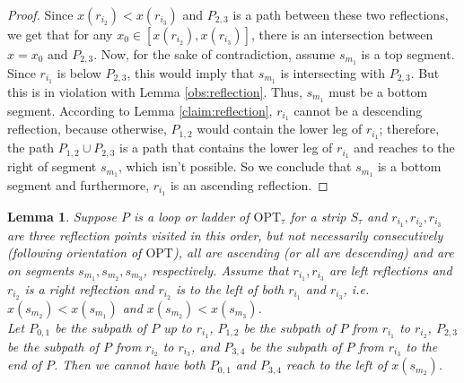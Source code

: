 \documentclass[pdflatex,sn-mathphys-num]{sn-jnl}
\theoremstyle{thmstyleone}
\newtheorem{lemma}{Lemma}
\newcommand{\OPT}{{\text{OPT}}}
\begin{document}
\begin{proof}
	Since $x(r_{i_2}) < x(r_{i_3})$ and $P_{2,3}$ is a path between these two reflections, we get that for any $x_0 \in [x(r_{i_2}), x(r_{i_3})]$, there is an intersection between $x = x_0$ and $P_{2,3}$. Now, for the sake of contradiction, assume $s_{m_1}$ is a top segment. Since $r_{i_1}$ is below $P_{2,3}$, this would imply that $s_{m_1}$ is intersecting with $P_{2,3}$. But this is in violation with Lemma \ref{obs:reflection}. Thus, $s_{m_1}$ must be a bottom segment. According to Lemma \ref{claim:reflection}, $r_{i_1}$ cannot be a descending reflection, because otherwise, $P_{1,2}$ would contain the lower leg of $r_{i_1}$; therefore, the path $P_{1,2}\cup P_{2,3}$ is a path that contains the lower leg of $r_{i_1}$ and reaches to the right of segment $s_{m_1}$, which isn't possible.
	So we conclude that $s_{m_1}$ is a bottom segment and furthermore, $r_{i_1}$ is an ascending reflection.
\end{proof}
\begin{lemma}\label{lem:reflection-M}
    Suppose $P$ is a loop or ladder of $\OPT_\tau$ for a strip $S_\tau$ and $r_{i_1},r_{i_2},r_{i_3}$ are three reflection points
    visited in this order, but not necessarily consecutively (following orientation of $\OPT$), all are ascending (or all are descending) and are on segments $s_{m_1},s_{m_2},s_{m_3}$, respectively. Assume that $r_{i_1},r_{i_3}$ are left reflections and $r_{i_2}$ is a right reflection
    and $r_{i_2}$ is to the left of both $r_{i_1}$ and $r_{i_3}$, i.e. $x(s_{m_2})<x(s_{m_1})$ and $x(s_{m_2})< x(s_{m_3})$.\\
    Let $P_{0,1}$ be the subpath of $P$ up to $r_{i_1}$, $P_{1,2}$ be the subpath of $P$ from $r_{i_1}$ to $r_{i_2}$, $P_{2,3}$ be the subpath of $P$
    from $r_{i_2}$ to $r_{i_3}$, and $P_{3,4}$ be the subpath of $P$ from $r_{i_3}$ to the end of $P$.
    Then we cannot have both $P_{0,1}$ and $P_{3,4}$ reach to the left of $x(s_{m_2})$.
\end{lemma}
\end{document}
